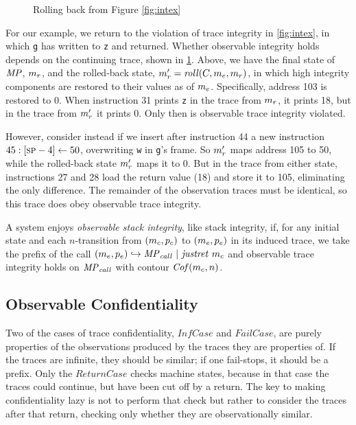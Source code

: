 \documentclass[acmsmall,review,anonymous]{acmart}\settopmatter{printfolios=true,printccs=false,printacmref=false}
\begin{document}
{    \begin{figure}
      \integritylazyexample
      \caption{Rolling back from Figure \ref{fig:intex}}
      \label{fig:intlex}
    \end{figure}

    For our example, we return to the violation of trace integrity in
    \cref{fig:intex}, in which {\tt g} has written to {\tt z} and returned.
    Whether observable integrity holds depends on the continuing trace, shown
    in \cref{fig:intlex}. Above, we have the final state of \(\mathit{MP}\),
    \(m_r\), and the rolled-back state, \(m_r' =
    \mathit{roll}(C,m_e,m_r)\), in which high integrity
    components are restored to their values as of \(m_e\). Specifically,
    address 103 is restored to 0. When instruction 31 prints {\tt z} in the
    trace from \(m_r\), it prints 18, but in the trace from \(m_r'\)
    it prints 0. Only then is observable trace integrity violated.

    However, consider instead if we insert after instruction 44 a new
    instruction \(45: [\textsc{sp}-4] \leftarrow 50\), overwriting {\tt w} in
    {\tt g}'s frame. So \(m_r'\) maps address 105 to 50, while the
    rolled-back state \(m_r'\) maps it to 0. But in the trace from either
    state, instructions 27 and 28 load the return value (18) and store it to
    105, eliminating the only difference. The remainder of the observation
    traces must be identical, so this trace does obey observable trace
    integrity.


      A system enjoys {\em observable stack integrity}, like stack integrity,
      if, for any initial state and each \(n\)-transition from
      \((m_c,p_c)\) to \((m_e,p_e)\) in its
      induced trace, we take the prefix of the call
      \((m_e,p_e) \hookrightarrow \mathit{MP}_{\mathit{call}} ~ | ~ \mathit{justret}\ m_c\)
      and observable trace integrity holds on \(\mathit{MP}_{\mathit{call}}\) with
      contour \(\mathit{Cof}(m_c,n)\).

  \subsection{Observable Confidentiality}

      Two of the cases of trace confidentiality, \(\mathit{InfCase}\)
      and \(\mathit{FailCase}\), are purely properties of the
      observations produced by the traces they are properties of. If
      the traces are infinite, they should be similar; if one
      fail-stops, it should be a prefix. Only the
      \(\mathit{ReturnCase}\) checks machine states, because in that
      case the traces could continue, but have been cut off by a
      return. The key to making confidentiality lazy is not to perform that
      check but rather to consider the traces after that return,
      checking only whether they are observationally similar.

}
\end{document}
